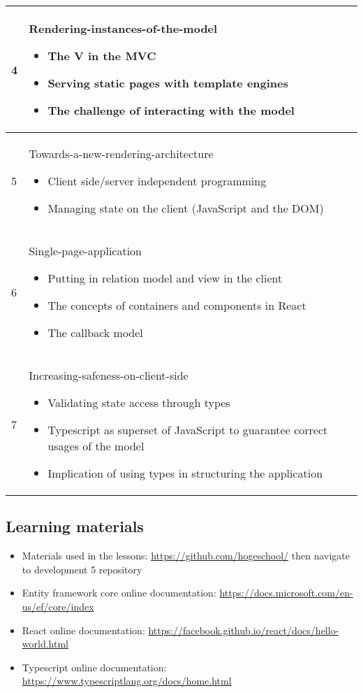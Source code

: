 \begin{tabular}{ | p{1.2cm} | p{10cm} | }
  		\hline
  		4 &  Rendering-instances-of-the-model
  		\begin{itemize}[nolistsep]
					\item The V in the MVC
					\item Serving static pages with template engines
					\item The challenge of interacting with the model
				\end{itemize}
  		 \\
  		\hline
  		5 & Towards-a-new-rendering-architecture
  		\begin{itemize}[nolistsep]
					\item Client side/server independent programming
					\item Managing state on the client (JavaScript and the DOM)
				\end{itemize}
  		 \\
  		\hline
  		6 & Single-page-application
  		\begin{itemize}[nolistsep]
				\item Putting in relation model and view in the client
				\item The concepts of containers and components in React
				\item The callback model
			\end{itemize}
			\\
  		\hline
  		7 & Increasing-safeness-on-client-side
  		\begin{itemize}[nolistsep]
				\item Validating state access through types
				\item Typescript as superset of JavaScript to guarantee correct usages of the model
				\item Implication of using types in structuring the application
				\end{itemize} 
				\\
			\hline
	\end{tabular}
		
\begin{comment}
    A unit does not necessarily match with a lesson. Some subjects of a unit could be discussed in tow different lessons.
\end{comment}
\newpage
\subsection{Learning materials}\label{learning-materials}
\begin{itemize}[nolistsep]
\item
  Materials used in the lessons:
  \url{https://github.com/hogeschool/} then navigate to development 5 repository
\item
  Entity framework core online documentation:
  \url{https://docs.microsoft.com/en-us/ef/core/index}
\item
  React online documentation:
  \url{https://facebook.github.io/react/docs/hello-world.html}
\item
  Typescript online documentation:
 \url{https://www.typescriptlang.org/docs/home.html}
\end{itemize}

